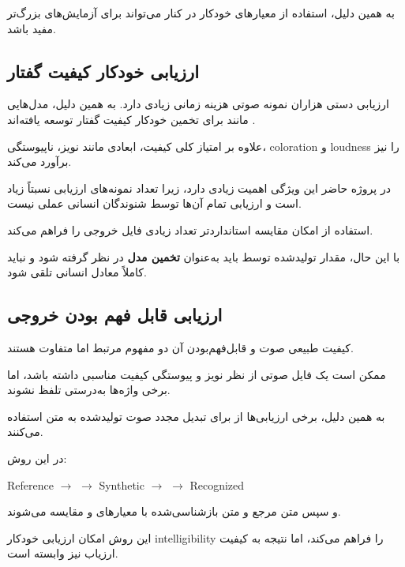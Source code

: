 به همین دلیل، استفاده از معیارهای خودکار در کنار  می‌تواند
برای آزمایش‌های بزرگ‌تر مفید باشد.


\subsection{ارزیابی خودکار کیفیت گفتار}

ارزیابی دستی هزاران نمونه صوتی هزینه زمانی زیادی دارد.
به همین دلیل، مدل‌هایی مانند
برای تخمین خودکار کیفیت گفتار توسعه یافته‌اند
\cite{mittag2021nisqa}.

 علاوه بر امتیاز کلی کیفیت، ابعادی مانند نویز،
ناپیوستگی، coloration و loudness را نیز برآورد می‌کند.

در پروژه حاضر این ویژگی اهمیت زیادی دارد، زیرا تعداد نمونه‌های
ارزیابی  نسبتاً زیاد است و ارزیابی تمام آن‌ها توسط
شنوندگان انسانی عملی نیست.

استفاده از  امکان مقایسه استانداردتر تعداد زیادی فایل
خروجی را فراهم می‌کند.

با این حال، مقدار تولیدشده توسط  باید به‌عنوان
\textbf{تخمین مدل}
در نظر گرفته شود و نباید کاملاً معادل  انسانی تلقی شود.


\subsection{ارزیابی قابل فهم بودن خروجی}

کیفیت طبیعی صوت و قابل‌فهم‌بودن آن دو مفهوم مرتبط اما
متفاوت هستند.

ممکن است یک فایل صوتی از نظر نویز و پیوستگی کیفیت مناسبی داشته
باشد، اما برخی واژه‌ها به‌درستی تلفظ نشوند.

به همین دلیل، برخی ارزیابی‌ها از  برای تبدیل مجدد صوت
تولیدشده به متن استفاده می‌کنند.

در این روش:

\begin{center}
Reference 
$\longrightarrow$
$\longrightarrow$
Synthetic 
$\longrightarrow$
$\longrightarrow$
Recognized 
\end{center}

و سپس متن مرجع و متن بازشناسی‌شده با معیارهای
و
مقایسه می‌شوند.

این روش امکان ارزیابی خودکار intelligibility را فراهم می‌کند،
اما نتیجه به کیفیت  ارزیاب نیز وابسته است.

